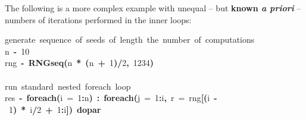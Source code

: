 \documentclass[a4paper,12pt]{article}\usepackage{graphicx, color}
\makeatletter
\newcommand{\hlnumber}[1]{\textcolor[rgb]{0,0,0}{#1}}%
\newcommand{\hlfunctioncall}[1]{\textcolor[rgb]{0.501960784313725,0,0.329411764705882}{\textbf{#1}}}%
\newcommand{\hlkeyword}[1]{\textcolor[rgb]{0,0,0}{\textbf{#1}}}%
\newcommand{\hlargument}[1]{\textcolor[rgb]{0.690196078431373,0.250980392156863,0.0196078431372549}{#1}}%
\newcommand{\hlcomment}[1]{\textcolor[rgb]{0.180392156862745,0.6,0.341176470588235}{#1}}%
\newcommand{\hlassignement}[1]{\textcolor[rgb]{0,0,0}{\textbf{#1}}}%
\newcommand{\hlsymbol}[1]{\textcolor[rgb]{0,0,0}{#1}}%
\newcommand{\hlstd}[1]{\textcolor[rgb]{0,0,0}{#1}}%
\newenvironment{kframe}{%
 \def\FrameCommand##1{\hskip\@totalleftmargin \hskip-\fboxsep
 \colorbox{shadecolor}{##1}\hskip-\fboxsep
     \hskip-\linewidth \hskip-\@totalleftmargin \hskip\columnwidth}%
 \MakeFramed {\advance\hsize-\width
   \@totalleftmargin\z@ \linewidth\hsize
   \@setminipage}}%
 {\par\unskip\endMakeFramed}
\newenvironment{knitrout}{}{} %
\renewenvironment{knitrout}{\begin{footnotesize}}{\end{footnotesize}}
\makeatother
\begin{document}
The following is a more complex example with unequal -- but \textbf{known \emph{a priori}} -- 
numbers of iterations performed in the inner loops:

\begin{knitrout}
\color{fgcolor}\begin{kframe}
\begin{flushleft}
\ttfamily\noindent
\hlcomment{\usebox{\hlnormalsizeboxhash}{\ }generate{\ }sequence{\ }of{\ }seeds{\ }of{\ }length{\ }the{\ }number{\ }of{\ }computations}\hspace*{\fill}\\
\hlstd{}\hlsymbol{n}{\ }\hlassignement{\usebox{\hlnormalsizeboxlessthan}-}{\ }\hlnumber{10}\hspace*{\fill}\\
\hlstd{}\hlsymbol{rng}{\ }\hlassignement{\usebox{\hlnormalsizeboxlessthan}-}{\ }\hlfunctioncall{RNGseq}\hlkeyword{(}\hlsymbol{n}{\ }\hlkeyword{*}{\ }\hlkeyword{(}\hlsymbol{n}{\ }\hlkeyword{+}{\ }\hlnumber{1}\hlkeyword{)}\hlkeyword{/}\hlnumber{2}\hlkeyword{,}{\ }\hlnumber{1234}\hlkeyword{)}\hspace*{\fill}\\
\hlstd{}\hspace*{\fill}\\
\hlstd{}\hlcomment{\usebox{\hlnormalsizeboxhash}{\ }run{\ }standard{\ }nested{\ }foreach{\ }loop}\hspace*{\fill}\\
\hlstd{}\hlsymbol{res}{\ }\hlassignement{\usebox{\hlnormalsizeboxlessthan}-}{\ }\hlfunctioncall{foreach}\hlkeyword{(}\hlargument{i}{\ }\hlargument{=}{\ }\hlnumber{1}\hlkeyword{:}\hlsymbol{n}\hlkeyword{)}{\ }\hlkeyword{\usebox{\hlnormalsizeboxpercent}:\usebox{\hlnormalsizeboxpercent}}{\ }\hlfunctioncall{foreach}\hlkeyword{(}\hlargument{j}{\ }\hlargument{=}{\ }\hlnumber{1}\hlkeyword{:}\hlsymbol{i}\hlkeyword{,}{\ }\hlargument{r}{\ }\hlargument{=}{\ }\hlsymbol{rng}\hlkeyword{[}\hlkeyword{(}\hlsymbol{i}{\ }\hlkeyword{-}{\ }\hlnumber{1}\hlkeyword{)}{\ }\hlkeyword{*}{\ }\hlsymbol{i}\hlkeyword{/}\hlnumber{2}{\ }\hlkeyword{+}{\ }\hlnumber{1}\hlkeyword{:}\hlsymbol{i}\hlkeyword{]}\hlkeyword{)}{\ }\hlkeyword{\usebox{\hlnormalsizeboxpercent}dopar\usebox{\hlnormalsizeboxpercent}}\hspace*{\fill}\\
\hlstd{}{\ }{\ }{\ }{\ }\hlkeyword{\usebox{\hlnormalsizeboxopenbrace}}\hspace*{\fill}\\
\hlstd{}\hspace*{\fill}\\

\end{flushleft}
\end{kframe}
\end{knitrout}
\end{document}
